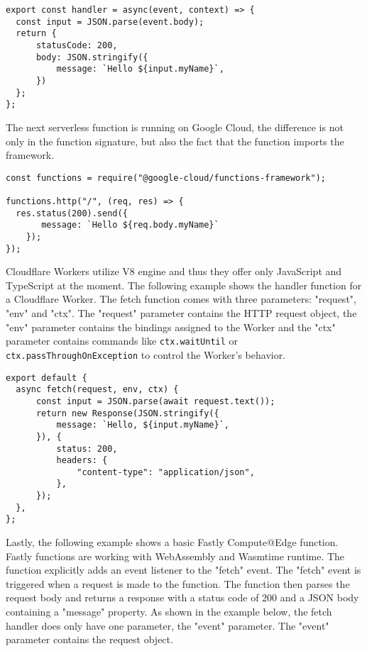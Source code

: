 \begin{lstlisting}[frame=lines, style=ES6, caption={Basic standard AWS Lambda handler function}, showstringspaces=false, captionpos=b,]
export const handler = async(event, context) => {
  const input = JSON.parse(event.body);
  return {
      statusCode: 200,
      body: JSON.stringify({
          message: `Hello ${input.myName}`,
      })
  };
};
\end{lstlisting}
The next \gls{serverless} function is running on Google Cloud, the difference is not only in the function signature, but also the fact that the function imports the framework.

\begin{lstlisting}[frame=lines, style=ES6, caption={Basic Gen. 2 Google Cloud handler function}, showstringspaces=false, captionpos=b,]
const functions = require("@google-cloud/functions-framework");

functions.http("/", (req, res) => {
  res.status(200).send({
       message: `Hello ${req.body.myName}`
    });
});
\end{lstlisting}

Cloudflare Workers utilize \gls{V8} engine and thus they offer only JavaScript and TypeScript at the moment. The following example shows the handler function for a Cloudflare Worker. The fetch function comes with three parameters: "request", "env" and "ctx". The "request" parameter contains the HTTP request object, the "env" parameter contains the bindings assigned to the Worker and the "ctx" parameter contains commands like \texttt{ctx.waitUntil} or \texttt{ctx.passThroughOnException} to control the Worker's behavior. 

\begin{lstlisting}[frame=lines, style=ES6, caption={Basic Cloudflare Workers hanlder function}, showstringspaces=false, captionpos=b,]
export default {
  async fetch(request, env, ctx) {
      const input = JSON.parse(await request.text());
      return new Response(JSON.stringify({
          message: `Hello, ${input.myName}`,
      }), {
          status: 200,
          headers: {
              "content-type": "application/json",
          },
      });
  },
};
\end{lstlisting}

Lastly, the following example shows a basic Fastly Compute@Edge \cite{fastlyinc_serverless} function. Fastly functions are working with WebAssembly and Wasmtime runtime. The function explicitly adds an event listener to the "fetch" event. The "fetch" event is triggered when a request is made to the function. The function then parses the request body and returns a response with a status code of 200 and a JSON body containing a "message" property. As shown in the example below, the fetch handler does only have one parameter, the "event" parameter. The "event" parameter contains the request object. 

